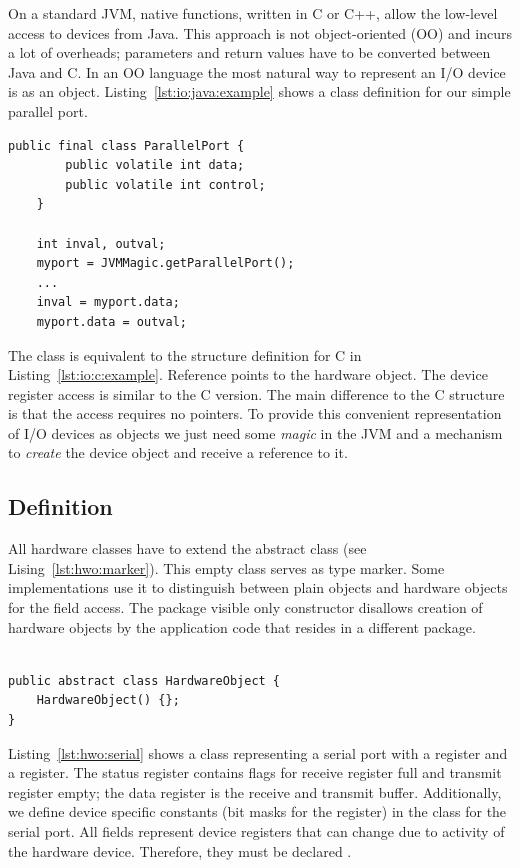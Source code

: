 On a standard JVM, native functions, written in C or C++, allow the
low-level access to devices from Java. This approach is not
object-oriented (OO) and incurs a lot of overheads; parameters and
return values have to be converted between Java and C. In an OO
language the most natural way to represent an I/O device is as an
object. Listing~\ref{lst:io:java:example} shows a class definition
for our simple parallel port.

\begin{lstlisting}[float=t,caption={The parallel port device as a simple Java class},
label=lst:io:java:example]
    public final class ParallelPort {
        public volatile int data;
        public volatile int control;
    }

    int inval, outval;
    myport = JVMMagic.getParallelPort();
    ...
    inval = myport.data;
    myport.data = outval;
\end{lstlisting}

The class  is equivalent to the structure
definition for C in Listing~\ref{lst:io:c:example}. Reference
 points to the hardware object. The device register
access is similar to the C version. The main difference to the C
structure is that the access requires no pointers. To provide this
convenient representation of I/O devices as objects we just need some
\emph{magic} in the JVM and a mechanism to \emph{create} the device
object and receive a reference to it.


\subsection{Definition}

All hardware classes have to extend the abstract class
 (see Lising~\ref{lst:hwo:marker}). This empty
class serves as type marker. Some implementations use it to
distinguish between plain objects and hardware objects for the field
access. The package visible only constructor disallows creation of
hardware objects by the application code that resides in a different
package.

\begin{lstlisting}[float,caption={The marker class for hardware objects},
label=lst:hwo:marker]

public abstract class HardwareObject {
    HardwareObject() {};
}
\end{lstlisting}


Listing~\ref{lst:hwo:serial} shows a class representing a serial port
with a  register and a  register. The status
register contains flags for receive register full and transmit
register empty; the data register is the receive and transmit buffer.
Additionally, we define device specific constants (bit masks for the
 register) in the class for the serial port. All fields
represent device registers that can change due to activity of the
hardware device. Therefore, they must be declared .

